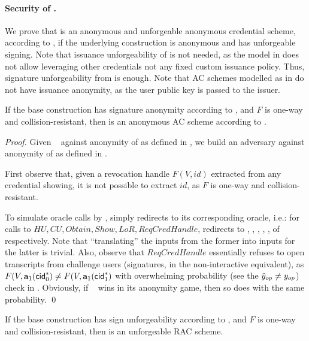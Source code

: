 \paragraph{Security of \CUASRAC.} %
We prove that \CUASRAC is an anonymous and unforgeable anonymous credential
scheme, according to \cite{fhs19}, if the underlying \CUASGen construction
is anonymous and has unforgeable signing. Note that issuance unforgeability
of \CUASGen is not needed, as the model in \cite{fhs19} does not allow
leveraging other credentials not any fixed custom issuance policy. Thus,
signature unforgeability from \UAS is enough. Note that AC schemes modelled
as in \cite{fhs19} do not have issuance anonymity, as the user public key
is passed to the issuer.

\begin{theorem}
  \label{thm:anon-cuasac}
  If the base \CUASGen construction has signature anonymity according to
  , and $F$ is one-way and collision-resistant,
  then \CUASAC is an anonymous AC scheme according to \cite{fhs19}.
\end{theorem}

\begin{proof}
  Given \adv~ against anonymity of \CUASRAC as defined in
  , we build an adversary \advB against anonymity of
  \CUASGen as defined in .

  First observe that, given a revocation handle $F(V,id)$ extracted from any
  credential showing, it is not possible to extract $id$, as $F$ is one-way
  and collision-resistant.
  
  To simulate oracle calls by \adv, \advB simply redirects to its corresponding
  oracle, i.e.: for calls to $HU,CU,Obtain,Show,LoR,ReqCredHandle$, \advB
  redirects to \HUGEN, \CUGEN, \OBTAIN, \SIGN, \CHALb, of \OPEN respectively.
  Note that ``translating'' the inputs from the former into inputs for the
  latter is trivial. Also, observe that $ReqCredHandle$ essentially refuses to
  open transcripts from challenge users (signatures, in the non-interactive
  equivalent), as $F(V,\mathbf{a}_1(\mathsf{cid}^*_0) \neq F(V,\mathbf{a}_1(\mathsf{cid}^*_1)$ with
  overwhelming probability (see the $\tilde{y}_{op} \neq y_{op}$) check in
  . Obviously, if \adv~ wins in its anonymity game, then
  so does \advB with the same probability.
  \qed
\end{proof}

\begin{theorem}
  If the base \CUASGen construction has sign unforgeability according to
  , and $F$ is one-way and collision-resistant, then
  \CUASRAC is an unforgeable RAC scheme.
\end{theorem}


